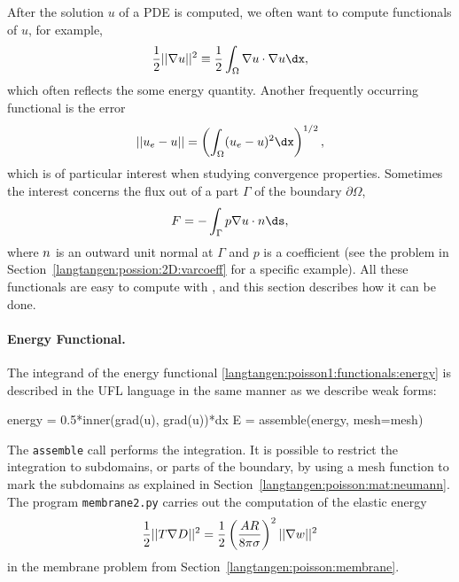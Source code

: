 After the solution $u$ of a PDE is computed, we often want to compute
functionals of $u$, for example, 
\begin{equation}
{1\over2}||\nabla u||^2 \equiv {1\over2}\int_\Omega \nabla u\cdot \nabla u\dx,
\label{langtangen:poisson1:functionals:energy}
\end{equation}
which often reflects the some energy quantity.
Another frequently occurring functional is the error 
\begin{equation}
||u_e-u|| = \left(\int_\Omega (u_e-u)^2\dx\right)^{1/2},
\label{langtangen:poisson1:functionals:error}
\end{equation}
which is of particular interest when studying convergence properties.
Sometimes the interest concerns the flux out of a part $\Gamma$ of
the boundary $\partial\Omega$,
\begin{equation}
F = -\int_\Gamma p\nabla u\cdot\langtangennormalvec\ds,
\label{langtangen:poisson1:functionals:flux}
\end{equation}
where ${n}$ is an outward unit normal at $\Gamma$ and $p$ is a
coefficient (see the problem in Section~\ref{langtangen:possion:2D:varcoeff}
for a specific example).
All these functionals are easy to compute with \fenics, and this section
describes how it can be done.

\paragraph{Energy Functional.}
The integrand of the
energy functional \eqref{langtangen:poisson1:functionals:energy}
is described in the UFL language in the same manner as we describe
weak forms:
\begin{python}
energy = 0.5*inner(grad(u), grad(u))*dx
E = assemble(energy, mesh=mesh)
\end{python}
The {\fontsize{10pt}{10pt}\texttt{assemble}} call performs the integration.
It is possible to restrict the integration to subdomains, or parts
of the boundary, by using
a mesh function to mark the subdomains as explained in
Section~\ref{langtangen:poisson:mat:neumann}.
The program {\fontsize{10pt}{10pt}\texttt{membrane2.py}} carries out the computation of
the elastic energy 
\[ {1\over2}||T\nabla D||^2 = {1\over2}\left({AR\over 8\pi\sigma}\right)^2 
||\nabla w||^2\] 
in the membrane problem from
Section~\ref{langtangen:poisson:membrane}.

